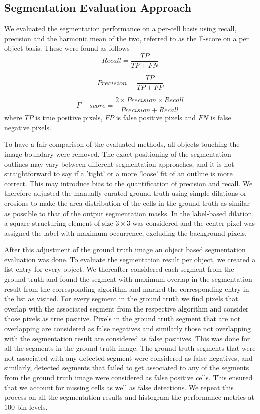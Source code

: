 \documentclass[journal]{IEEEtran}
\begin{document}
\subsection{Segmentation Evaluation Approach}

We evaluated the segmentation performance on a per-cell basis using recall, precision and the harmonic mean of the two, referred to as the F-score on a per object basis. These were found as follows\begin{equation*}
Recall = \frac{TP}{TP + FN}
\end{equation*}

\begin{equation*}
Precision = \frac{TP}{TP + FP}
\end{equation*}

\begin{equation*}
F-score = \frac{2\times Precision \times Recall}{Precision + Recall}
\end{equation*}
where $TP$ is true positive pixels, $FP$ is false positive pixels and $FN$ is false negative pixels.

To have a fair comparison of the evaluated methods, all objects touching the image boundary were removed. The exact positioning of the segmentation outlines may vary between different segmentation approaches, and it is not straightforward to say if a 'tight' or a more 'loose' fit of an outline is more correct. This may introduce bias to the quantification of precision and recall. We therefore adjusted the manually curated ground truth using simple dilations or erosions to make the area distribution of the cells in the ground truth as similar as possible to that of the output segmentation masks. In the label-based dilation, a square structuring element of size $3 \times 3$ was considered and the center pixel was assigned the label with maximum occurrence, excluding the background pixels. 

After this adjustment of the ground truth image an object based segmentation evaluation was done. To evaluate the segmentation result per object, we created a list entry for every object. We thereafter considered each segment from the ground truth and found the segment with maximum overlap in the segmentation result from the corresponding algorithm and marked the corresponding entry in the list as visited. For every segment in the ground truth we find pixels that overlap with the associated segment from the respective algorithm and consider those pixels as true positive. Pixels in the ground truth segment that are not overlapping are considered as false negatives and similarly those not overlapping with the segmentation result are considered as false positives. This was done for all the segments in the ground truth image. The ground truth segments that were not associated with any detected segment were considered as false negatives, and similarly, detected segments that failed to get associated to any of the segments from the ground truth image were considered as false positive cells. This ensured that we account for missing cells as well as false detections. We repeat this process on all the segmentation results and histogram the performance metrics at $100$ bin levels.
\end{document}
